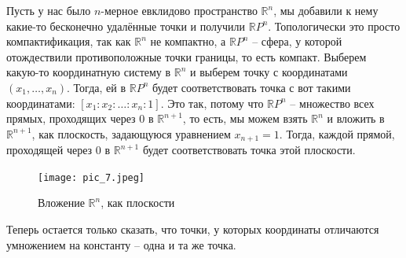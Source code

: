 \documentclass[11pt]{article}
\begin{document}
    Пусть у нас было $n$-мерное евклидово пространство $\mathbb{R}^n$, мы добавили к нему какие-то бесконечно удалённые точки
    и получили $\mathbb{R}P^n$. Топологически это просто компактификация, так как $\mathbb{R}^n$ не компактно, а $\mathbb{R}P^n$ -- сфера, у которой отождествили противоположные точки границы, то есть компакт.
    Выберем какую-то координатную систему в $ \mathbb{R}^n$ и выберем точку с координатами $(x_1, \ldots, x_n)$.
    Тогда, ей в $\mathbb{R}P^n$ будет соответствовать точка с вот такими координатами: $[x_1 : x_2 : \ldots : x_n : 1]$. Это так, потому что $\mathbb{R}P^n$ -- множество всех прямых, проходящих через 0 в $\mathbb{R}^{n + 1}$, то есть, мы можем взять $\mathbb{R}^n$ и вложить в $\mathbb{R}^{n + 1}$, как плоскость, задающуюся уравнением $x_{n + 1} = 1$. Тогда, каждой прямой, проходящей через 0 в $\mathbb{R}^{n + 1}$ будет соответствовать точка этой плоскости. \\
    \begin{center}
    \begin{figure}[h]
        \centering
        \texttt{[image: pic\_7.jpeg]}
        \caption{Вложение $\mathbb{R}^n$, как плоскости}
    \end{figure}
    \end{center}
    Теперь остается только сказать, что точки, у которых координаты отличаются умножением на константу -- одна и та же точка.\\
\end{document}
